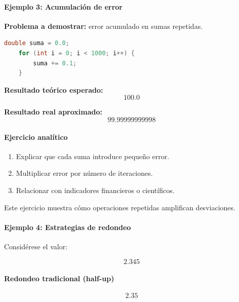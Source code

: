 \documentclass[12pt,twoside]{book}
\begin{document}
						\paragraph{Ejemplo 3: Acumulación de error}
						
						\noindent
						\textbf{Problema a demostrar:} error acumulado en sumas repetidas.
						
						\begin{lstlisting}[language=C]
	double suma = 0.0;
	for (int i = 0; i < 1000; i++) {
		suma += 0.1;
	} \end{lstlisting}
						
						\noindent
						\textbf{Resultado teórico esperado:}
						\[
						100.0
						\]
						
						\noindent
						\textbf{Resultado real aproximado:}
						\[
						99.99999999998
						\]
						
						\paragraph{Ejercicio analítico}
						
						\begin{enumerate}
							\item Explicar que cada suma introduce pequeño error.
							\item Multiplicar error por número de iteraciones.
							\item Relacionar con indicadores financieros o científicos.
						\end{enumerate}
						
						\noindent
						Este ejercicio muestra cómo operaciones repetidas amplifican desviaciones.
						
						\paragraph{Ejemplo 4: Estrategias de redondeo}
						
						\noindent
						Considérese el valor:
						
						\[
						2.345
						\]
						
						\paragraph{Redondeo tradicional (half-up)}
						
						\[
						2.35
						\]
						
\end{document}
